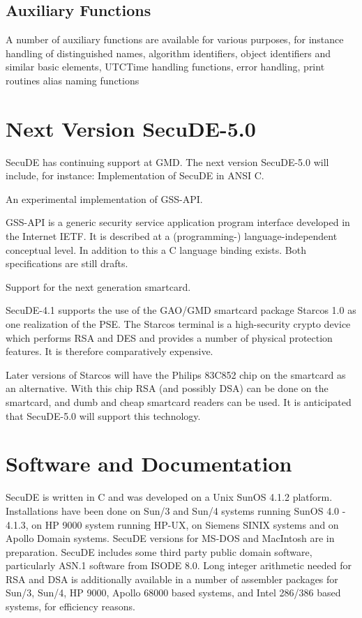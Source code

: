 \subsection{Auxiliary Functions}

A number of auxiliary functions are available for various purposes,
for instance
\bi
\m handling of distinguished names, algorithm identifiers, object
   identifiers and similar basic elements,
\m UTCTime handling functions,
\m error handling,
\m print routines
\m alias naming functions
\ei

\section{Next Version SecuDE-5.0}
SecuDE has continuing support at GMD. The next version SecuDE-5.0 will include, 
for instance:
\bi
\m Implementation of SecuDE in ANSI C.

\m An experimental implementation of GSS-API. 

   GSS-API is a generic security service application program interface
   developed in the Internet IETF. It is described at a (programming-) 
   language-independent conceptual level. In addition to this
   a C language binding exists. Both specifications are still drafts.
 
\m Support for the next generation smartcard. 

   SecuDE-4.1 supports the use of the GAO/GMD smartcard package Starcos 1.0 as
   one realization of the PSE. The Starcos terminal
   is a high-security crypto device which performs RSA and DES and provides a number of 
   physical protection features. It is therefore comparatively expensive. 

   Later versions of Starcos will have the Philips 83C852 chip on the smartcard as an 
   alternative. With this chip RSA (and possibly DSA) can be done on the smartcard, 
   and dumb and cheap smartcard readers can be used. It is anticipated that 
   SecuDE-5.0 will support this technology.
\ei

\section{Software and Documentation}

SecuDE is written in C and was developed on a Unix SunOS 4.1.2 platform.
Installations have been done on Sun/3 and Sun/4 systems running SunOS 4.0 - 4.1.3,
on HP 9000 system running HP-UX, on Siemens SINIX systems and on Apollo Domain systems.
SecuDE versions for MS-DOS and MacIntosh are in preparation.
SecuDE includes some third party public domain software, particularly ASN.1 software
from ISODE 8.0. Long integer arithmetic
needed for RSA and DSA is additionally available in a number of assembler packages for Sun/3, Sun/4,
HP 9000, Apollo 68000 based systems, and Intel 286/386 based systems, for efficiency reasons.

